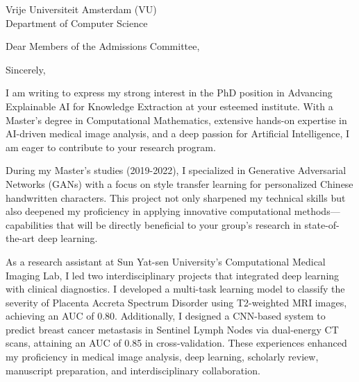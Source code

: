 \documentclass[10pt,a4paper,roman]{moderncv}
\begin{document}
\vspace{-4em}
{
Vrije Universiteit Amsterdam (VU)\\
Department of Computer Science\\
}
\date{\today}
\opening{Dear Members of the Admissions Committee,}
\closing{Sincerely,}
\makelettertitle
\thispagestyle{empty}
\pagestyle{empty}
I am writing to express my strong interest in the PhD position in 
Advancing Explainable AI for Knowledge Extraction at your esteemed institute. 
With a Master's degree in Computational Mathematics, 
extensive hands-on expertise in AI-driven medical image analysis, 
and a deep passion for Artificial Intelligence, I am eager to contribute to your research program.

During my Master's studies (2019-2022), 
I specialized in Generative Adversarial Networks (GANs) with a focus on style transfer learning 
for personalized Chinese handwritten characters. 
This project not only sharpened my technical skills but also deepened my proficiency 
in applying innovative computational methods—capabilities that will be 
directly beneficial to your group's research in state-of-the-art deep learning.

As a research assistant at Sun Yat-sen University's Computational Medical Imaging Lab, 
I led two interdisciplinary projects that integrated deep learning with clinical diagnostics. 
I developed a multi-task learning model to classify the severity of Placenta Accreta Spectrum Disorder using T2-weighted MRI images, achieving an AUC of 0.80. 
Additionally, I designed a CNN-based system to predict breast cancer metastasis in Sentinel Lymph Nodes via dual-energy CT scans, attaining an AUC of 0.85 in cross-validation. 
These experiences enhanced my proficiency in medical image analysis, deep learning, scholarly review, manuscript preparation, and interdisciplinary collaboration.
\end{document}

